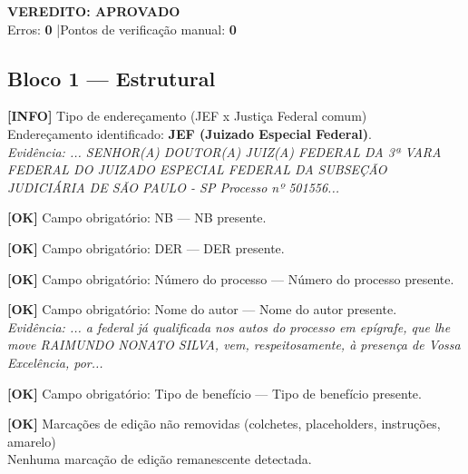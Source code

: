 \documentclass[12pt,a4paper]{article}
\newcommand{\statusOK}[1]{\textcolor{corOK}{\textbf{[OK]}} #1}
\newcommand{\statusINFO}[1]{\textcolor{corINFO}{\textbf{[INFO]}} #1}
\begin{document}
\vspace{0.5em}

\noindent\colorbox{corFundoAprovado}{%
  \begin{minipage}{\dimexpr\linewidth-2\fboxsep}
    \centering
    \vspace{0.3em}
    {\large \textcolor{corOK}{\textbf{VEREDITO: APROVADO}}}\\
    Erros: \textbf{0} \quad|\quad Pontos de verificação manual: \textbf{0}
    \vspace{0.3em}
  \end{minipage}%
}

\vspace{1em}


\subsection{Bloco 1 --- Estrutural}

\statusINFO{Tipo de endereçamento (JEF x Justiça Federal comum)}\\
Endereçamento identificado: \textbf{JEF (Juizado Especial Federal)}.\\
\textit{Evidência: ... SENHOR(A) DOUTOR(A) JUIZ(A) FEDERAL DA 3ª VARA FEDERAL DO JUIZADO ESPECIAL FEDERAL DA SUBSEÇÃO JUDICIÁRIA DE SÃO PAULO - SP Processo nº 501556...}

\medskip
\statusOK{Campo obrigatório: NB} --- NB presente.

\medskip
\statusOK{Campo obrigatório: DER} --- DER presente.

\medskip
\statusOK{Campo obrigatório: Número do processo} --- Número do processo presente.

\medskip
\statusOK{Campo obrigatório: Nome do autor} --- Nome do autor presente.\\
\textit{Evidência: ... a federal já qualificada nos autos do processo em epígrafe, que lhe move RAIMUNDO NONATO SILVA, vem, respeitosamente, à presença de Vossa Excelência, por...}

\medskip
\statusOK{Campo obrigatório: Tipo de benefício} --- Tipo de benefício presente.

\medskip
\statusOK{Marcações de edição não removidas (colchetes, placeholders, instruções, amarelo)}\\
Nenhuma marcação de edição remanescente detectada.
\end{document}
